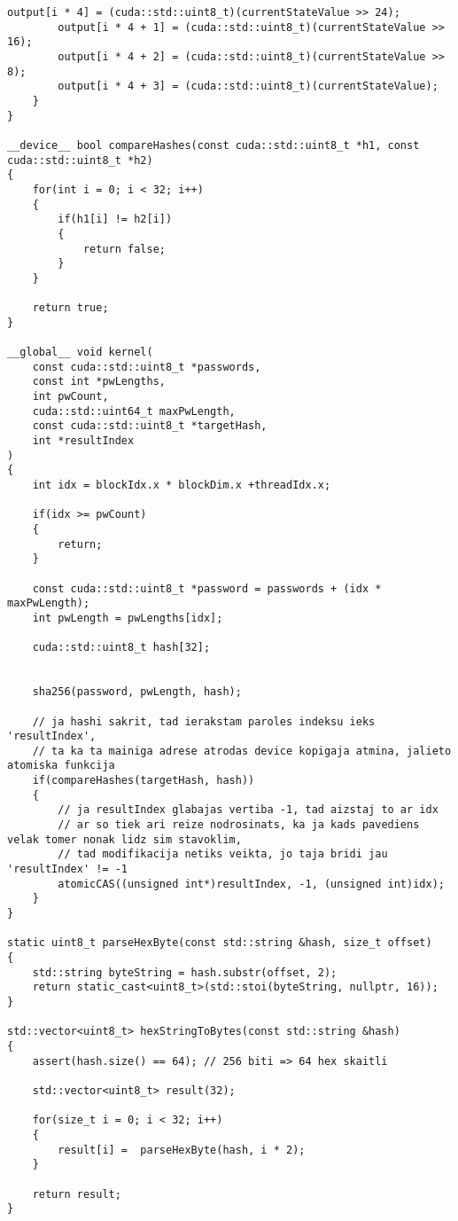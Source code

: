 \documentclass[12pt]{report}%
\theoremstyle{definition}
\begin{document}
\begin{lstlisting}[caption={Paroļu lauzēja implementācija CUDA vidē},
  label=lst:cuda_impl,
  captionpos=t
  ]
        output[i * 4] = (cuda::std::uint8_t)(currentStateValue >> 24);
        output[i * 4 + 1] = (cuda::std::uint8_t)(currentStateValue >> 16);
        output[i * 4 + 2] = (cuda::std::uint8_t)(currentStateValue >> 8);
        output[i * 4 + 3] = (cuda::std::uint8_t)(currentStateValue);
    }
}

__device__ bool compareHashes(const cuda::std::uint8_t *h1, const cuda::std::uint8_t *h2)
{
    for(int i = 0; i < 32; i++)
    {
        if(h1[i] != h2[i])
        {
            return false;
        }
    }

    return true;
}

__global__ void kernel(
    const cuda::std::uint8_t *passwords,
    const int *pwLengths,
    int pwCount,
    cuda::std::uint64_t maxPwLength,
    const cuda::std::uint8_t *targetHash,
    int *resultIndex
)
{
    int idx = blockIdx.x * blockDim.x +threadIdx.x;

    if(idx >= pwCount)
    {
        return;
    }

    const cuda::std::uint8_t *password = passwords + (idx * maxPwLength);
    int pwLength = pwLengths[idx];

    cuda::std::uint8_t hash[32];


    sha256(password, pwLength, hash);

    // ja hashi sakrit, tad ierakstam paroles indeksu ieks 'resultIndex',
    // ta ka ta mainiga adrese atrodas device kopigaja atmina, jalieto atomiska funkcija
    if(compareHashes(targetHash, hash))
    {
        // ja resultIndex glabajas vertiba -1, tad aizstaj to ar idx
        // ar so tiek ari reize nodrosinats, ka ja kads pavediens velak tomer nonak lidz sim stavoklim,
        // tad modifikacija netiks veikta, jo taja bridi jau 'resultIndex' != -1
        atomicCAS((unsigned int*)resultIndex, -1, (unsigned int)idx);
    }
}

static uint8_t parseHexByte(const std::string &hash, size_t offset)
{
    std::string byteString = hash.substr(offset, 2);
    return static_cast<uint8_t>(std::stoi(byteString, nullptr, 16));
}

std::vector<uint8_t> hexStringToBytes(const std::string &hash)
{
    assert(hash.size() == 64); // 256 biti => 64 hex skaitli
    
    std::vector<uint8_t> result(32);

    for(size_t i = 0; i < 32; i++)
    {
        result[i] =  parseHexByte(hash, i * 2);
    }

    return result;
}



\end{lstlisting}
\end{document}
